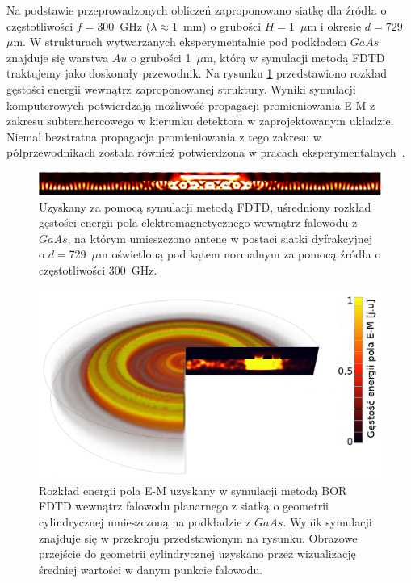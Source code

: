 Na podstawie przeprowadzonych obliczeń zaproponowano siatkę dla źródła o częstotliwości $f=300$~GHz ($\lambda\approx 1$~mm) o grubości $H=1$~$\mu$m i okresie $d=729$~$\mu$m. W strukturach wytwarzanych eksperymentalnie pod podkładem $GaAs$ znajduje się warstwa $Au$ o grubości 1~$\mu$m, którą w symulacji metodą FDTD traktujemy jako doskonały przewodnik. Na rysunku \ref{fig:consrc_1d_f300Ghz} przedstawiono rozkład gęstości energii wewnątrz zaproponowanej struktury. Wyniki symulacji komputerowych potwierdzają  możliwość propagacji promieniowania E-M z zakresu subterahercowego w kierunku detektora w zaprojektowanym układzie. Niemal bezstratna propagacja promieniowania z tego zakresu w półprzewodnikach została również potwierdzona w pracach eksperymentalnych~\cite{roux2002grating}.

\begin{figure}[tb]
	\includegraphics[width=\textwidth]{images/thz/consrc_siatka1d_300GHz_d729um.png}
	\caption{Uzyskany za pomocą symulacji metodą FDTD, uśredniony rozkład gęstości energii pola elektromagnetycznego wewnątrz falowodu z $GaAs$, na którym umieszczono antenę w postaci siatki dyfrakcyjnej o $d=$729~$\mu$m oświetloną pod kątem normalnym za pomocą źródła o częstotliwości 300~GHz.  }
	\label{fig:consrc_1d_f300Ghz}
\end{figure}

\begin{figure}[tb]
	\includegraphics[width=\textwidth]{images/antenaThz/tort.png}
	\caption{Rozkład energii pola E-M uzyskany w symulacji metodą BOR FDTD wewnątrz falowodu planarnego z siatką o geometrii cylindrycznej umieszczoną na podkładzie z $GaAs$. Wynik symulacji znajduje się w przekroju przedstawionym na rysunku. Obrazowe przejście do geometrii cylindrycznej uzyskano przez wizualizację średniej wartości w danym punkcie falowodu.}	
	\label{fig:concent_modfalo}
\end{figure}

